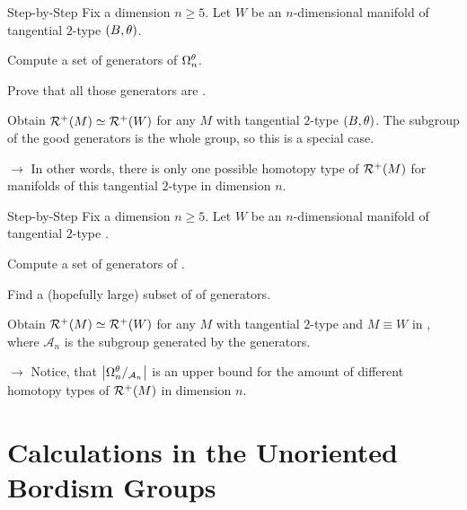 \documentclass{presis}
\begin{document}
\begin{frame}{Step-by-Step}
    Fix a dimension $n\geq5$. Let $W$ be an $n$-dimensional manifold of tangential $2$-type $(B,\theta)$.\pause
    \begin{vfilleditems}
    \item[\protect\circled{1}] Compute a set of generators of $\Omega_n^\theta$.\pause
    \item[\protect\circled{2}] Prove that all those generators are \good.{}\pause
    \item[\protect\circled{3}] Obtain $\mathcal{R}^+(M) \simeq \mathcal{R}^+(W)$ for any $M$ with tangential $2$-type $(B,\theta)$.
        {\color{black} The subgroup of the good generators is the whole group, so this is a special case.} %
    \end{vfilleditems}\pause
    $\rightarrow$ In other words, there is only one possible homotopy type of $\mathcal{R}^+(M)$ for manifolds of this tangential $2$-type in dimension $n$.
\end{frame}

\begin{frame}{Step-by-Step}
    Fix a dimension $n\geq 5$. Let $W$ be an $n$-dimensional manifold of tangential $2$-type .
    \begin{vfilleditems}
    \item[\protect\circled{1}] Compute a set of generators of .\pause
    \item[\protect\circled{2}] Find a (hopefully large) subset of of \good{} generators.\pause
    \item[\protect\circled{3}] Obtain $\mathcal{R}^+(M) \simeq \mathcal{R}^+(W)$ for any $M$ with tangential $2$-type  and $M \equiv W$ in , where $\mathcal{A}_n$ is the subgroup generated by the \good{} generators.\pause
    \end{vfilleditems}
    $\rightarrow$ Notice, that $\left\lvert\Omega_n^\theta/_{\mathcal{A}_n}\right\rvert$ is an upper bound for the amount of different homotopy types of $\mathcal{R}^+(M)$ in dimension $n$.
\end{frame}

\section{Calculations in the Unoriented Bordism Groups}
\end{document}
